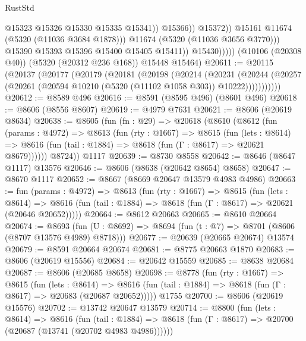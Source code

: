 \begin{lexlean}{RustStd}
\begin{coremodule}
                                    @15323
                                    @15326
                                    @15330
                                    @15335
                                    @15341))
                                @15366))
                            @15372))
                        @15161
                        @11674
                        (@5320 (@11036 @3684 @1878)))
                      @11674
                      (@5320 (@11036 @3656 @3770)))
                    @15390
                    @15393
                    @15396
                    @15400
                    @15405
                    @15411))
                @15430)))))
      (@10106 (@20308 @40))
      (@5320 (@20312 @236 @168))
      @15448
      @15464)
@20611 := @20115
    (@20137
      (@20177
        (@20179
          (@20181
            (@20198
              (@20214
                (@20231
                  (@20244
                    (@20257 (@20261 (@20594 @10210 (@5320 (@11102 @1058 @303)) @10222)))))))))))
@20612 := @8589 @496
@20616 := @8591 (@8595 @496) (@8601 @496)
@20618 := @8606 (@8556 @8607)
@20619 := @4979 @7631
@20621 := @8606 (@20619 @8634)
@20638 := @8605
    (fun (fn : @29) =>
    @20618
      (@8610
        (@8612
          (fun (params : @4972) =>
          @8613
            (fun (rty : @1667) =>
            @8615
              (fun (lets : @8614) =>
              @8616 (fun (tail : @1884) => @8618 (fun (Γ : @8617) => @20621 @8679))))))
        @8724))
    @1117
@20639 := @8730 @8558
@20642 := @8646 (@8647 @1117) @13576
@20646 := @8606 (@8638 (@20642 @8654) @8658)
@20647 := @8670 @1117
@20652 := @8667 (@8669 @20647 @13579 @4983 @4986)
@20663 := fun (params : @4972) =>
  @8613
    (fun (rty : @1667) =>
    @8615
      (fun (lets : @8614) =>
      @8616 (fun (tail : @1884) => @8618 (fun (Γ : @8617) => @20621 (@20646 @20652)))))
@20664 := @8612 @20663
@20665 := @8610 @20664
@20674 := @8693
    (fun (U : @8692) => @8694 (fun (t : @7) => @8701 (@8606 (@8707 @13576 @4989) @8718)))
@20677 := @20639 (@20665 @20674) @13574
@20679 := @8591 @20664 @20674
@20681 := @8775 @20663 @1870
@20683 := @8606 (@20619 @15556)
@20684 := @20642 @15559
@20685 := @8638 @20684
@20687 := @8606 (@20685 @8658)
@20698 := @8778
    (fun (rty : @1667) =>
    @8615
      (fun (lets : @8614) =>
      @8616 (fun (tail : @1884) => @8618 (fun (Γ : @8617) => @20683 (@20687 @20652)))))
    @1755
@20700 := @8606 (@20619 @15576)
@20702 := @13742 @20647 @13579
@20714 := @8800
    (fun (lets : @8614) =>
    @8616
      (fun (tail : @1884) =>
      @8618 (fun (Γ : @8617) => @20700 (@20687 (@13741 (@20702 @4983 @4986))))))

\end{coremodule}
\end{lexlean}
